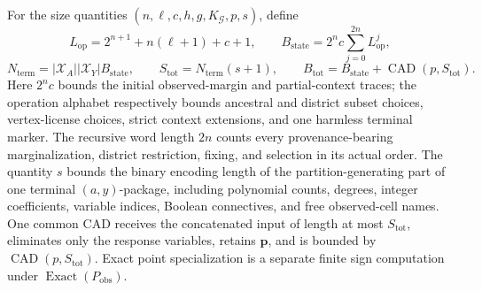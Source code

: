 For the size quantities \((n,\ell,c,h,g,K_{\mathcal G},p,s)\), define
\[
L_{\mathrm{op}}=2^{n+1}+n(\ell+1)+c+1,
\qquad
B_{\mathrm{state}}=2^n c\sum_{j=0}^{2n}L_{\mathrm{op}}^j,
\]
\[
N_{\mathrm{term}}=|\mathcal X_A||\mathcal X_Y|B_{\mathrm{state}},
\qquad
S_{\mathrm{tot}}=N_{\mathrm{term}}(s+1),
\qquad
B_{\mathrm{tot}}=B_{\mathrm{state}}+\operatorname{CAD}(p,S_{\mathrm{tot}}).
\]
Here \(2^n c\) bounds the initial observed-margin and partial-context traces; the operation alphabet respectively bounds ancestral and district subset choices, vertex-license choices, strict context extensions, and one harmless terminal marker. The recursive word length \(2n\) counts every provenance-bearing marginalization, district restriction, fixing, and selection in its actual order. The quantity \(s\) bounds the binary encoding length of the partition-generating part of one terminal \((a,y)\)-package, including polynomial counts, degrees, integer coefficients, variable indices, Boolean connectives, and free observed-cell names. One common CAD receives the concatenated input of length at most \(S_{\mathrm{tot}}\), eliminates only the response variables, retains \(\mathbf p\), and is bounded by \(\operatorname{CAD}(p,S_{\mathrm{tot}})\). Exact point specialization is a separate finite sign computation under \(\operatorname{Exact}(P_{\mathrm{obs}})\).